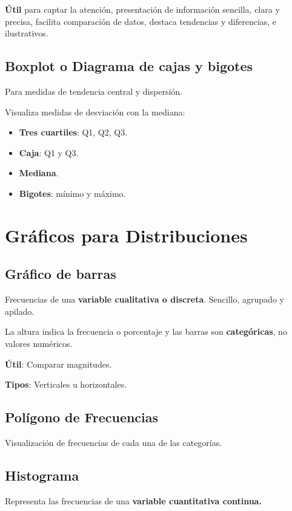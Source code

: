\documentclass[12pt, twoside, openright]{report} %
\begin{document}
\textbf{Útil} para captar la atención, presentación de información
sencilla, clara y precisa, facilita comparación de datos, destaca
tendencias y diferencias, e ilustrativos.

\subsection{Boxplot o Diagrama de cajas y
	bigotes}

Para medidas de tendencia central y dispersión.

Visualiza medidas de desviación con la mediana:

\begin{itemize}
	\item \textbf{Tres cuartiles}: Q1, Q2, Q3.
	\item \textbf{Caja}: Q1 y Q3.
	\item \textbf{Mediana}.
	\item \textbf{Bigotes}: mínimo y máximo.
\end{itemize}

\section{Gráficos para
  Distribuciones}

\subsection{Gráfico de barras}

Frecuencias de una \textbf{variable cualitativa o discreta}. Sencillo,
agrupado y apilado.

La altura indica la frecuencia o porcentaje y las barras son
\textbf{categóricas}, no valores numéricos.

\textbf{Útil}: Comparar magnitudes.

\textbf{Tipos}: Verticales u horizontales.

\subsection{Polígono de
	Frecuencias}

Visualización de frecuencias de cada una de las categorías.

\subsection{Histograma}

Representa las frecuencias de una \textbf{variable cuantitativa
	continua.}
\end{document}
